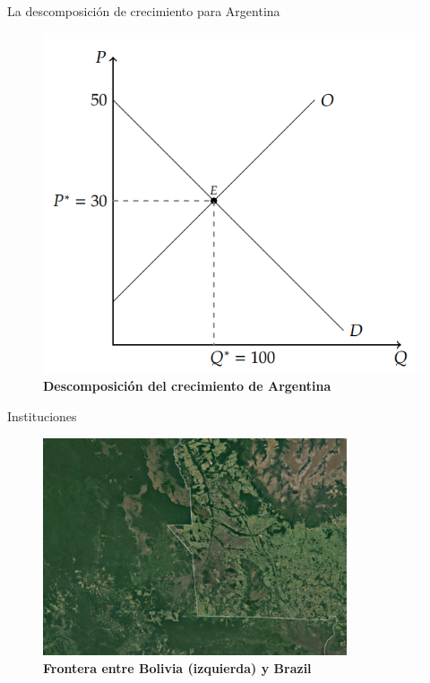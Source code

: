 \documentclass{beamer}
\begin{document}
\begin{frame}{La descomposición de crecimiento para Argentina}
    \begin{figure} [H]   \includegraphics[scale=0.55]{../Figures/C17.4.png}
\caption{\textbf{Descomposición del crecimiento de Argentina}}
\label{fig:26.4}
\end{figure}
\end{frame}


\begin{frame}{Instituciones}
    
\begin{figure}[H]
\begin{center}
\includegraphics[width=0.8\textwidth]{../Figures/C26.2.png}
\end{center}
\caption{\textbf{Frontera entre Bolivia (izquierda) y Brazil}}
\label{fig:border_bol_bra}
\end{figure}
\end{frame}
\end{document}
